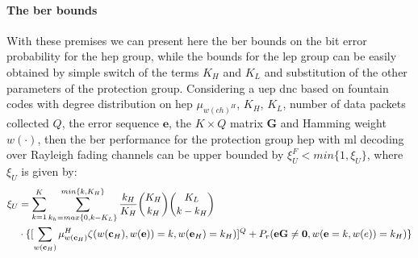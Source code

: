 \paragraph{The \gls{ber} bounds}
With these premises we can present here the \gls{ber} bounds on the bit error probability for the \gls{hep} group, while the bounds for the \gls{lep} group can be easily obtained by simple switch of the terms $K_H$ and $K_L$ and substitution of the other parameters of the protection group. Considering a \gls{uep} \gls{dnc} based on fountain codes with degree distribution on \gls{hep} $\mu_{w(ch)^H}$, $K_H$, $K_L$, number of data packets collected $Q$, the error sequence $\mathbf{e}$, the $K\times Q$ matrix $\mathbf{G}$ and Hamming weight $w(\cdot)$, then the \gls{ber} performance for the protection group \gls{hep} with \gls{ml} decoding over Rayleigh fading channels can be upper bounded by $\xi_U^F < min\{1,\xi_U\}$, where $\xi_U$ is given by:
\begin{align}
\centering
  \xi_U & = \sum_{k=1}^K\sum_{k_h = max\{0,k-K_L\}}^{min\{k,K_H\}}\frac{k_H}{K_H}\binom{K_H}{k_H}\binom{K_L}{k - k_H}\\
   &\cdot \{[\sum_{w(\mathbf{c}_H)}\mu_{w(\mathbf{c}_H)}^H\zeta(w(\mathbf{c}_H),w(\mathbf{e})) = k,w(\mathbf{e}_H) = k_H)]^Q+P_r(\mathbf{eG} \neq \mathbf{0},w(\mathbf{e} = k, w(e)) = k_H)\}
\end{align}
